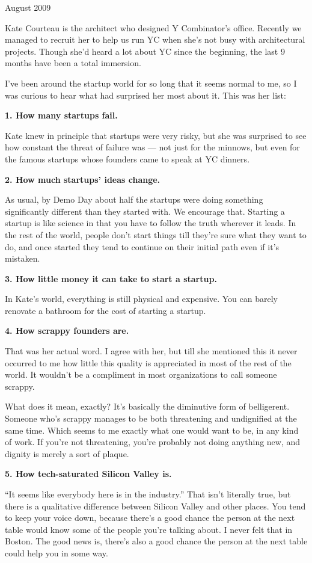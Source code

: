 August 2009

Kate Courteau is the architect who designed Y Combinator's office.
Recently we managed to recruit her to help us run YC when she's not busy
with architectural projects. Though she'd heard a lot about YC since the
beginning, the last 9 months have been a total immersion.

I've been around the startup world for so long that it seems normal to
me, so I was curious to hear what had surprised her most about it. This
was her list:

\textbf{1. How many startups fail.}

Kate knew in principle that startups were very risky, but she was
surprised to see how constant the threat of failure was --- not just for
the minnows, but even for the famous startups whose founders came to
speak at YC dinners.

\textbf{2. How much startups' ideas change.}

As usual, by Demo Day about half the startups were doing something
significantly different than they started with. We encourage that.
Starting a startup is like science in that you have to follow the truth
wherever it leads. In the rest of the world, people don't start things
till they're sure what they want to do, and once started they tend to
continue on their initial path even if it's mistaken.

\textbf{3. How little money it can take to start a startup.}

In Kate's world, everything is still physical and expensive. You can
barely renovate a bathroom for the cost of starting a startup.

\textbf{4. How scrappy founders are.}

That was her actual word. I agree with her, but till she mentioned this
it never occurred to me how little this quality is appreciated in most
of the rest of the world. It wouldn't be a compliment in most
organizations to call someone scrappy.

What does it mean, exactly? It's basically the diminutive form of
belligerent. Someone who's scrappy manages to be both threatening and
undignified at the same time. Which seems to me exactly what one would
want to be, in any kind of work. If you're not threatening, you're
probably not doing anything new, and dignity is merely a sort of plaque.

\textbf{5. How tech-saturated Silicon Valley is.}

``It seems like everybody here is in the industry.'' That isn't
literally true, but there is a qualitative difference between Silicon
Valley and other places. You tend to keep your voice down, because
there's a good chance the person at the next table would know some of
the people you're talking about. I never felt that in Boston. The good
news is, there's also a good chance the person at the next table could
help you in some way.

